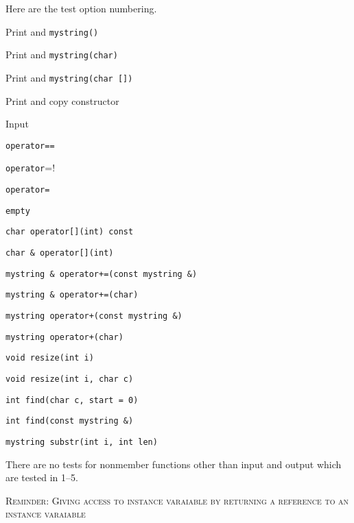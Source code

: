 Here are the test option numbering.
\begin{tightlist}
    \item   Print and \verb!mystring()!
    \item   Print and \verb!mystring(char)!
    \item   Print and \verb!mystring(char [])!
    \item   Print and copy constructor
    \item   Input
    \item   \verb!operator==!
    \item   \verb!operator!=!
    \item   \verb!operator=!
    \item   \verb!empty!
    \item   \verb!char operator[](int) const!
    \item   \verb!char & operator[](int)!
    \item   \verb!mystring & operator+=(const mystring &)!
    \item   \verb!mystring & operator+=(char)!
    \item   \verb!mystring operator+(const mystring &)!
    \item   \verb!mystring operator+(char)!
    \item   \verb!void resize(int i)!
    \item   \verb!void resize(int i, char c)!
    \item   \verb!int find(char c, start = 0)!
    \item   \verb!int find(const mystring &)!
    \item   \verb!mystring substr(int i, int len)!
\end{tightlist}
There are no tests for nonmember functions other than input and output
which are tested in 1--5.






\newpage
\textsc{Reminder: Giving access to instance varaiable by returning a reference to an instance varaiable}

